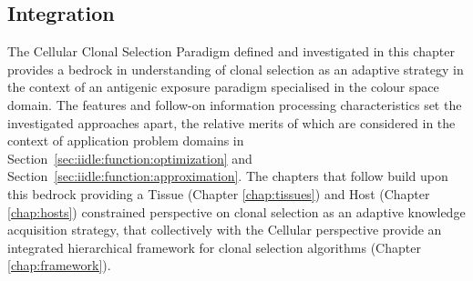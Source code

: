 %
%
\subsection{Integration}
The Cellular Clonal Selection Paradigm defined and investigated in this chapter provides a bedrock in understanding of clonal selection as an adaptive strategy in the context of an antigenic exposure paradigm specialised in the colour space domain. 
The features and follow-on information processing characteristics set the investigated approaches apart, the relative merits of which are considered in the context of application problem domains in Section~\ref{sec:iidle:function:optimization} and Section~\ref{sec:iidle:function:approximation}. The chapters that follow build upon this bedrock providing a Tissue (Chapter \ref{chap:tissues}) and Host (Chapter \ref{chap:hosts}) constrained perspective on clonal selection as an adaptive knowledge acquisition strategy, that collectively with the Cellular perspective provide an integrated hierarchical framework for clonal selection algorithms (Chapter \ref{chap:framework}).

